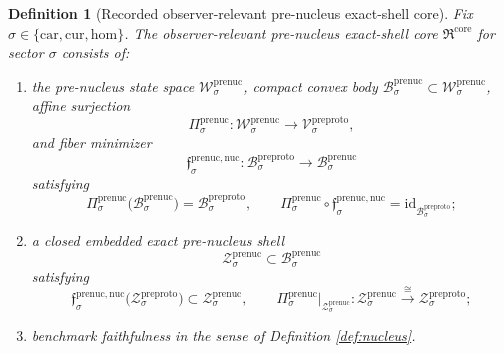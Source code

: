 \documentclass[11pt]{article}
\newcommand{\Car}{\mathrm{car}}
\newcommand{\Cur}{\mathrm{cur}}
\newcommand{\Hom}{\mathrm{hom}}
\newcommand{\PreProtoSpace}[1]{\mathcal V_{#1}^{\mathrm{preproto}}}
\newcommand{\PreProtoBody}[1]{\mathcal B_{#1}^{\mathrm{preproto}}}
\newcommand{\PreProtoShellSet}[1]{\mathcal Z_{#1}^{\mathrm{preproto}}}
\newcommand{\PreNucCore}{\mathfrak R^{\mathrm{core}}}
\newcommand{\PreNucSpace}[1]{\mathcal W_{#1}^{\mathrm{prenuc}}}
\newcommand{\PreNucBody}[1]{\mathcal B_{#1}^{\mathrm{prenuc}}}
\newcommand{\PreNucProj}[1]{\Pi_{#1}^{\mathrm{prenuc}}}
\newcommand{\PreNucNucleusMin}[1]{\mathfrak f_{#1}^{\mathrm{prenuc,nuc}}}
\newcommand{\PreNucShellSet}[1]{\mathcal Z_{#1}^{\mathrm{prenuc}}}
\newtheorem{definition}{Definition}
\begin{document}
\begin{definition}[Recorded observer-relevant pre-nucleus exact-shell core]
\label{def:core}
Fix \(\sigma\in\{\Car,\Cur,\Hom\}\). The observer-relevant pre-nucleus exact-shell core \(\PreNucCore\) for sector \(\sigma\) consists of:
\begin{enumerate}
    \item the pre-nucleus state space \(\PreNucSpace{\sigma}\), compact convex body \(\PreNucBody{\sigma}\subset\PreNucSpace{\sigma}\), affine surjection
    \[
    \PreNucProj{\sigma}:\PreNucSpace{\sigma}\to\PreProtoSpace{\sigma},
    \]
    and fiber minimizer
    \[
    \PreNucNucleusMin{\sigma}:\PreProtoBody{\sigma}\to\PreNucBody{\sigma}
    \]
    satisfying
    \[
    \PreNucProj{\sigma}\bigl(\PreNucBody{\sigma}\bigr)=\PreProtoBody{\sigma},
    \qquad
    \PreNucProj{\sigma}\circ\PreNucNucleusMin{\sigma}
    =
    \mathrm{id}_{\PreProtoBody{\sigma}};
    \]
    \item a closed embedded exact pre-nucleus shell
    \[
    \PreNucShellSet{\sigma}\subset\PreNucBody{\sigma}
    \]
    satisfying
    \[
    \PreNucNucleusMin{\sigma}\bigl(\PreProtoShellSet{\sigma}\bigr)
    \subset
    \PreNucShellSet{\sigma},
    \qquad
    \PreNucProj{\sigma}\big|_{\PreNucShellSet{\sigma}}
    :
    \PreNucShellSet{\sigma}
    \xrightarrow{\cong}
    \PreProtoShellSet{\sigma};
    \]
    \item benchmark faithfulness in the sense of Definition \ref{def:nucleus}.
\end{enumerate}
\end{definition}
\end{document}
